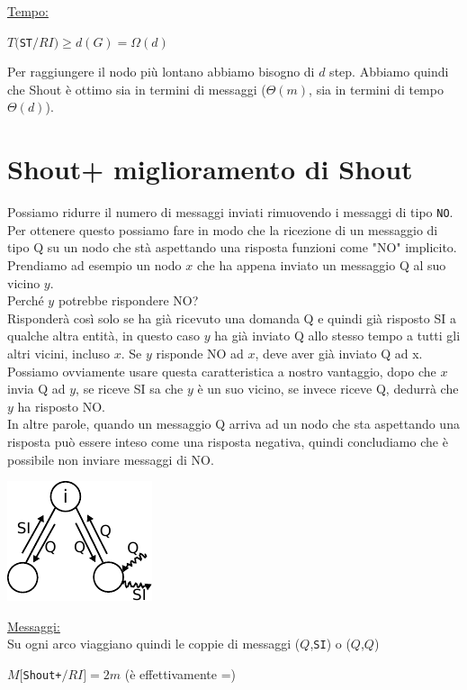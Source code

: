 \underline{Tempo:}
\begin{center}
    $T($\texttt{ST}$/RI) \geq d(G) = \Omega(d)$
\end{center}
Per raggiungere il nodo più lontano abbiamo bisogno di $d$ step. Abbiamo quindi
che Shout è ottimo sia in termini di messaggi ($\Theta(m)$, sia in termini di
tempo $\Theta(d)$).

\section{Shout+ miglioramento di Shout}
Possiamo ridurre il numero di messaggi inviati rimuovendo i messaggi di tipo
\texttt{NO}. Per ottenere questo possiamo fare in modo che la ricezione di un
messaggio di tipo Q su un nodo che stà aspettando una risposta funzioni come
"NO" implicito.\\
Prendiamo ad esempio un nodo $x$ che ha appena inviato un messaggio Q al suo
vicino $y$.\\ Perché $y$ potrebbe rispondere NO? \\Risponderà così solo se ha
già ricevuto una domanda Q e quindi già risposto SI a qualche altra entità, in
questo caso $y$ ha già inviato Q allo stesso tempo a tutti gli altri vicini,
incluso $x$. Se $y$ risponde NO ad $x$, deve aver già inviato Q ad x. Possiamo
ovviamente usare questa caratteristica a nostro vantaggio, dopo che $x$ invia Q
ad $y$, se riceve SI sa che $y$ è un suo vicino, se invece riceve Q, dedurrà che
$y$ ha risposto NO.\\
In altre parole, quando un messaggio Q arriva ad un nodo che sta aspettando una
risposta può essere inteso come una risposta negativa, quindi concludiamo che è
possibile non inviare messaggi di NO.
\begin{center}
    \includegraphics[scale=1.4]{capitoli/costruzione-spanning-tree/imgs/n_23}
\end{center}
\underline{Messaggi:}\\
Su ogni arco viaggiano quindi le coppie di messaggi ($Q$,\texttt{SI}) o
($Q$,$Q$)

\begin{center}
    $M[$\texttt{Shout+}$/RI] = 2m$ (è effettivamente =)\\
\end{center}

